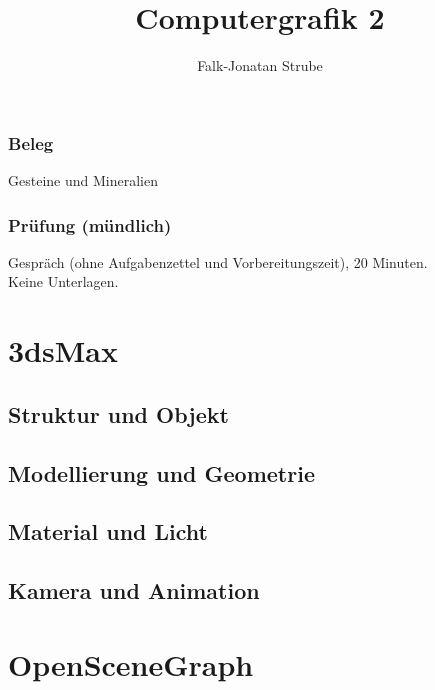 \documentclass{scrreprt}
\title{Computergrafik 2}
\author{Falk-Jonatan Strube}
\begin{document}
\maketitle
\tableofcontents


\section*{Beleg}
Gesteine und Mineralien

\section*{Prüfung (mündlich)}
Gespräch (ohne Aufgabenzettel und Vorbereitungszeit), 20 Minuten.\\
Keine Unterlagen.

\part{3dsMax}

\chapter{Struktur und Objekt}


\chapter{Modellierung und Geometrie}


\chapter{Material und Licht}


\chapter{Kamera und Animation}


\part{OpenSceneGraph}
\end{document}
